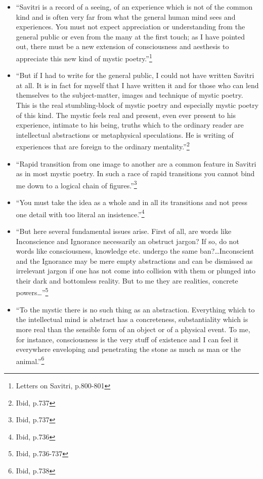 \documentclass[12pt,a4paper]{book}
\begin{document}
\begin{itemize}
\renewcommand{\labelitemi}{$\diamond$}
\item ``Savitri is a record of a seeing, of an experience which is not
  of the common kind and is often very far from what the general human
  mind sees and experiences. You must not expect appreciation or
  understanding from the general public or even from the many at the
  first touch; as I have pointed out, there must be a new extension of
  consciousness and aesthesis to appreciate this new kind of mystic
  poetry.''\footnote{Letters on Savitri, p.800-801}

\item ``But if I had to write for the general public, I could not have
  written Savitri at all. It is in fact for myself that I have written
  it and for those who can lend themselves to the subject-matter,
  images and technique of mystic poetry. This is the real
  stumbling-block of mystic poetry and especially mystic poetry of
  this kind. The mystic feels real and present, even ever present to
  his experience, intimate to his being, truths which to the ordinary
  reader are intellectual abstractions or metaphysical
  speculations. He is writing of experiences that are foreign to the
  ordinary mentality.''\footnote{Ibid, p.737}

\item ``Rapid transition from one image to another are a common
  feature in Savitri as in most mystic poetry. In such a race of rapid
  transitions you cannot bind me down to a logical chain of
  figures.''\footnote{Ibid, p.737}

\item ``You must take the idea as a whole and in all its transitions
  and not press one detail with too literal an
  insistence.''\footnote{Ibid, p.736}

\item ``But here several fundamental issues arise. First of all, are
  words like Inconscience and Ignorance necessarily an obstruct
  jargon? If so, do not words like consciousness, knowledge
  etc. undergo the same ban?\ldots Inconscient and the Ignorance may
  be mere empty abstractions and can be dismissed as irrelevant jargon
  if one has not come into collision with them or plunged into their
  dark and bottomless reality. But to me they are realities, concrete
  powers\ldots''\footnote{Ibid, p.736-737}

\item ``To the mystic there is no such thing as an
  abstraction. Everything which to the intellectual mind is abstract
  has a concreteness, substantiality which is more real than the
  sensible form of an object or of a physical event. To me, for
  instance, consciousness is the very stuff of existence and I can
  feel it everywhere enveloping and penetrating the stone as much as
  man or the animal.''\footnote{Ibid, p.738}


\end{itemize}
\end{document}
